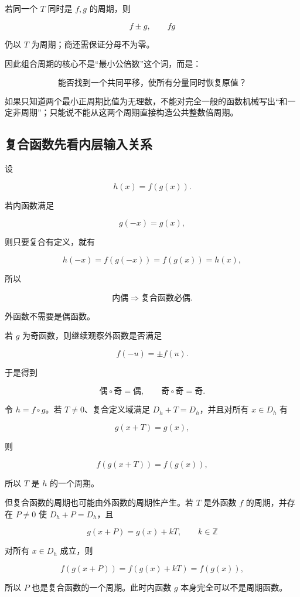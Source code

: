 \documentclass[11pt,a4paper]{ctexart}
\begin{document}
若同一个 \(T\) 同时是 \(f,g\) 的周期，则

\[
f\pm g,\qquad fg
\]

仍以 \(T\) 为周期；商还需保证分母不为零。

因此组合周期的核心不是``最小公倍数''这个词，而是：

\[
\boxed{\text{能否找到一个共同平移，使所有分量同时恢复原值？}}
\]

如果只知道两个最小正周期比值为无理数，不能对完全一般的函数机械写出``和一定非周期''；只能说不能从这两个周期直接构造公共整数倍周期。

\subsection{复合函数先看内层输入关系}\label{ux590dux5408ux51fdux6570ux5148ux770bux5185ux5c42ux8f93ux5165ux5173ux7cfb}

设

\[
h(x)=f(g(x)).
\]

若内函数满足

\[
g(-x)=g(x),
\]

则只要复合有定义，就有

\[
h(-x)=f(g(-x))=f(g(x))=h(x),
\]

所以

\[
\boxed{\text{内偶}\Rightarrow\text{复合函数必偶}.}
\]

外函数不需要是偶函数。

若 \(g\) 为奇函数，则继续观察外函数是否满足

\[
f(-u)=\pm f(u).
\]

于是得到

\[
\text{偶}\circ\text{奇}=\text{偶},\qquad
\text{奇}\circ\text{奇}=\text{奇}.
\]

令 \(h=f\circ g\)。若 \(T\ne0\)、复合定义域满足 \(D_h+T=D_h\)，并且对所有 \(x\in D_h\) 有

\[
g(x+T)=g(x),
\]

则

\[
f(g(x+T))=f(g(x)),
\]

所以 \(T\) 是 \(h\) 的一个周期。

但复合函数的周期也可能由外函数的周期性产生。若 \(T\) 是外函数 \(f\) 的周期，并存在 \(P\ne0\) 使 \(D_h+P=D_h\)，且

\[
g(x+P)=g(x)+kT,\qquad k\in\mathbb Z
\]

对所有 \(x\in D_h\) 成立，则

\[
f(g(x+P))=f(g(x)+kT)=f(g(x)),
\]

所以 \(P\) 也是复合函数的一个周期。此时内函数 \(g\) 本身完全可以不是周期函数。
\end{document}

